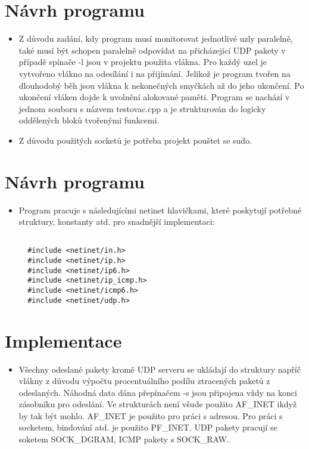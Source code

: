 \documentclass[a4paper,11pt]{article}
\begin{document}
\section*{Návrh programu}
\begin{itemize}
  \item Z důvodu zadání, kdy program musí monitorovat jednotlivé uzly paralelně, také musí být schopen paralelně odpovídat na přicházející UDP pakety v případě spínače -l jsou v projektu použita vlákna.
  Pro každý uzel je vytvořeno vlákno na odesílání i na přijímání. Jelikož je program tvořen na dlouhodobý běh jsou vlákna k nekonečných smyčkách až do jeho ukončení. Po ukončení vláken dojde k uvolnění alokované paměti.
  Program se nachází v jednom souboru s názvem testovac.cpp a je strukturován do logicky oddělených bloků tvořenými funkcemi.
  \item Z důvodu použitých socketů je potřeba projekt pouštet se sudo.
\end{itemize}

\section*{Návrh programu}
\begin{itemize}
  \item Program pracuje s následujícími netinet hlavičkami, které poskytují potřebné struktury, konstanty atd. pro snadnější implementaci:

  \lstset{language=C++}
  \begin{lstlisting}[frame=single,breaklines]

  #include <netinet/in.h>
  #include <netinet/ip.h>
  #include <netinet/ip6.h>
  #include <netinet/ip_icmp.h>
  #include <netinet/icmp6.h>
  #include <netinet/udp.h>

  \end{lstlisting}
\end{itemize}

\section*{Implementace}
\begin{itemize}
  \item Všechny odeslané pakety kromě UDP serveru se ukládají do struktury napříč vlákny z důvodu výpočtu procentuálního podílu ztracených paketů z odeslaných. Náhodná data dána přepínačem -s jsou připojena vždy na konci zásobníku pro odeslání.
  Ve strukturách není všude použito AF\_INET ikdyž by tak být mohlo. AF\_INET je použito pro práci s adresou. Pro práci s socketem, bindování atd. je použito PF\_INET. UDP pakety pracují se soketem SOCK\_DGRAM, ICMP pakety s SOCK\_RAW.
\end{itemize}
\end{document}
